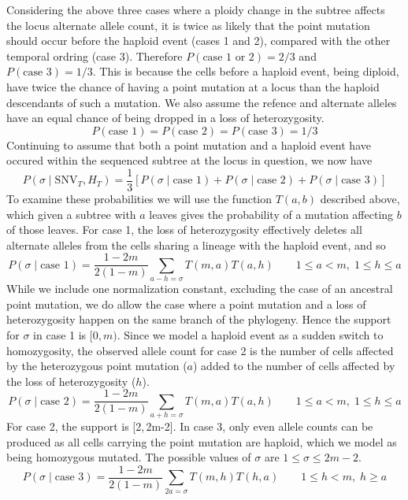 \documentclass[../../main.tex]{subfiles}
\begin{document}
Considering the above three cases where a ploidy change in the subtree affects the locus alternate allele count, it is twice as likely that the point mutation should occur before the haploid event (cases 1 and 2), compared with the other temporal ordring (case 3). Therefore $P(\text{case 1 or 2})=2/3$ and $P(\text{case 3})=1/3$. This is because the cells before a haploid event, being diploid, have twice the chance of having a point mutation at a locus than the haploid descendants of such a mutation. We also assume the refence and alternate alleles have an equal chance of being dropped in a loss of heterozygosity.
\begin{equation*}
P(\text{case 1})=P(\text{case 2}) = P(\text{case 3}) = 1/3
\end{equation*}
Continuing to assume that both a point mutation and a haploid event have occured within the sequenced subtree at the locus in question, we now have
\begin{equation*}
P(\sigma\mid\text{SNV}_T,H_T)=\frac{1}{3}\left[P(\sigma\mid\text{case 1})+P(\sigma\mid\text{case 2})+P(\sigma\mid\text{case 3})\right]
\end{equation*}
To examine these probabilities we will use the function $T(a,b)$ described above, which given a subtree with $a$ leaves gives the probability of a mutation affecting $b$ of those leaves. For case 1, the loss of heterozygosity effectively deletes all alternate alleles from the cells sharing a lineage with the haploid event, and so
\begin{equation*}
P(\sigma\mid\text{case 1}) = \frac{1-2m}{2(1-m)}\sum_{a-h=\sigma}T(m,a)T(a,h)\qquad 1\leq a < m,\;1\leq h\leq a
\end{equation*}
While we include one normalization constant, excluding the case of an ancestral point mutation, we do allow the case where a point mutation and a loss of heterozygosity happen on the same branch of the phylogeny. Hence the support for $\sigma$ in case 1 is $[0,m)$. Since we model a haploid event as a sudden switch to homozygosity, the observed allele count for case 2 is the number of cells affected by the heterozygous point mutation ($a$) added to the number of cells affected by the loss of heterozygosity ($h$).
\begin{equation*}
P(\sigma\mid\text{case 2}) = \frac{1-2m}{2(1-m)}\sum_{a+h=\sigma}T(m,a)T(a,h) \qquad 1\leq a < m,\;1\leq h\leq a
\end{equation*}
For case 2, the support is [2,\,2m-2]. In case 3, only even allele counts can be produced as all cells carrying the point mutation are haploid, which we model as being homozygous mutated. The possible values of $\sigma$ are $1\leq\sigma\leq 2m-2$.
\begin{equation*}
P(\sigma\mid\text{case 3}) = \frac{1-2m}{2(1-m)}\sum_{2a=\sigma} T(m,h)T(h,a) \qquad 1\leq h < m,\; h\geq a
\end{equation*}
\end{document}
